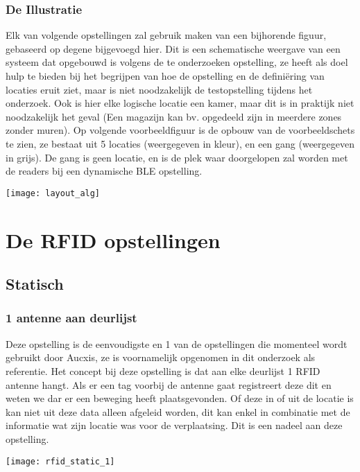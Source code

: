 \subsubsection{De Illustratie}
\begin{minipage}{0.65\textwidth}
Elk van volgende opstellingen zal gebruik maken van een bijhorende figuur, gebaseerd op degene bijgevoegd hier. Dit is een schematische weergave van een systeem dat opgebouwd is volgens de te onderzoeken opstelling, ze heeft als doel hulp te bieden bij het begrijpen van hoe de opstelling en de definiëring van locaties eruit ziet, maar is niet noodzakelijk de testopstelling tijdens het onderzoek. Ook is hier elke logische locatie een kamer, maar dit is in praktijk niet noodzakelijk het geval (Een magazijn kan bv. opgedeeld zijn in meerdere zones zonder muren). Op volgende voorbeeldfiguur is de opbouw van de voorbeeldschets te zien, ze bestaat uit 5 locaties (weergegeven in kleur), en een gang (weergegeven in grijs). De gang is geen locatie, en is de plek waar doorgelopen zal worden met de readers bij een dynamische BLE opstelling.
\end{minipage}
\hfill
\begin{minipage}{0.30\textwidth}
	\texttt{[image: layout\_alg]}
\end{minipage}

\section[RFID]{De RFID opstellingen}
\label{ch:rfid}

\subsection{Statisch}

\subsubsection{1 antenne aan deurlijst}
\begin{minipage}{0.65\textwidth}
Deze opstelling is de eenvoudigste en 1 van de opstellingen die momenteel wordt gebruikt door Aucxis, ze is voornamelijk opgenomen in dit onderzoek als referentie. Het concept bij deze opstelling is dat aan elke deurlijst 1 RFID antenne hangt. Als er een tag voorbij de antenne gaat registreert deze dit en weten we dar er een beweging heeft plaatsgevonden. Of deze in of uit de locatie is kan niet uit deze data alleen afgeleid worden, dit kan enkel in combinatie met de informatie wat zijn locatie was voor de verplaatsing. Dit is een nadeel aan deze opstelling.
\end{minipage}
\hfill
\begin{minipage}{0.30\textwidth}
	\texttt{[image: rfid\_static\_1]}
\end{minipage}

